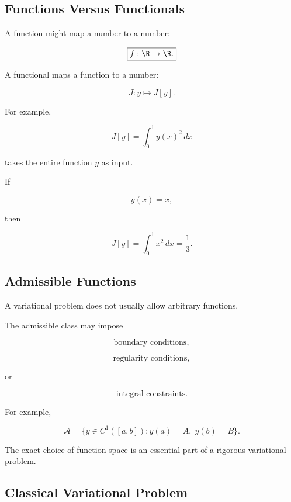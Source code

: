 \subsection{Functions Versus Functionals}
\label{subsec:functions-versus-functionals}

A function might map a number to a number:

\[
\boxed{
f:\R\to\R.
}
\]

A functional maps a function to a number:

\[
\boxed{
J:y\mapsto J[y].
}
\]

For example,

\[
J[y]
=
\int_0^1 y(x)^2\,dx
\]

takes the entire function \(y\) as input.

If

\[
y(x)=x,
\]

then

\[
J[y]
=
\int_0^1x^2\,dx
=
\frac13.
\]

\subsection{Admissible Functions}
\label{subsec:admissible-functions}

A variational problem does not usually allow arbitrary functions.

The admissible class may impose

\[
\boxed{
\text{boundary conditions},
}
\]

\[
\boxed{
\text{regularity conditions},
}
\]

or

\[
\boxed{
\text{integral constraints}.
}
\]

For example,

\[
\mathcal{A}
=
\{
y\in C^1([a,b]):
y(a)=A,\;
y(b)=B
\}.
\]

The exact choice of function space is an essential part of a rigorous
variational problem.

\subsection{Classical Variational Problem}
\label{subsec:classical-variational-problem}

